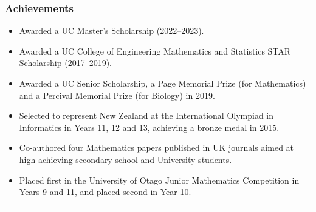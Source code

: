 \documentclass[a4paper,10pt]{article}
\begin{document}
\subsubsection*{Achievements}
\begin{itemize}
\item Awarded a UC Master's Scholarship (2022--2023).
\item Awarded a UC College of Engineering Mathematics and Statistics STAR Scholarship (2017--2019).
\item Awarded a UC Senior Scholarship, a Page Memorial Prize (for Mathematics) and a Percival Memorial Prize (for Biology) in 2019.
\item Selected to represent New Zealand at the International Olympiad in Informatics in Years 11, 12 and 13, achieving a bronze medal in 2015. 
\item Co-authored four Mathematics papers published in UK journals aimed at high achieving secondary school and University students.
\item Placed first in the University of Otago Junior Mathematics Competition in Years 9 and 11, and placed second in Year 10.
\end{itemize}
\hrule
\end{document}
